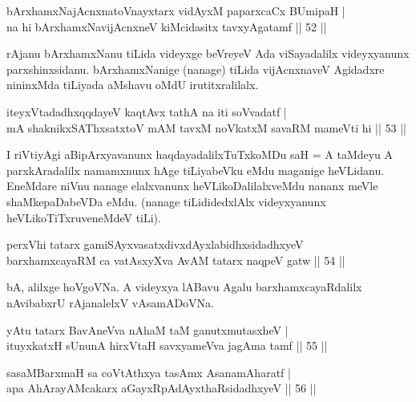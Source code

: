 \begin{shl}
bArxhamxNajAcnxnatoV\s nayxtarx vidAyxM paparxcaCx BUmipaH | \\
na hi bArxhamxNavijAcnxneV kiMcidasitx tavxyA\s gatamf \hfill|| 52 || 
\end{shl}

\begin{artha}
rAjanu bArxhamxNanu tiLida videyxge beVreyeV Ada viSayadalilx 
videyxyanunx parxshinxsidanu. bArxhamxNanige (nanage) tiLida vijAcnxnaveV 
Agidadxre nininxMda tiLiyada aMshavu oMdU irutitxralilalx.
\end{artha}

\begin{shl}
iteyxVtadadhxqqdayeV kaqtAvx tathA na iti soV\s vadatf | \\
mA shaknikxSAThxsatxtoV mAM tavxM noVkatxM savaRM mameVti hi \hfill|| 53 || 
\end{shl} 

\begin{artha}
I riVtiyAgi aBipArxyavanunx haqdayadalilxTuTxkoMDu saH = A taMdeyu A 
parxkAradalilx namamxnunx hAge tiLiyabeVku eMdu maganige heVLidanu. 
EneMdare niVnu nanage elalxvanunx heVLikoDalilalxveMdu nananx meVle 
shaMkepaDabeVDa eMdu. (nanage tiLididedxlAlx videyxyanunx 
heVLikoTiTxruveneMdeV tiLi).
\end{artha}

\begin{shl}
perxVhi tatarx gamiSAyxvasatxdivxdAyxlabidhxsidadhxyeV\\
barxhamxcayaRM ca vatAsxyXva AvAM tatarx naqpeV gatw \hfill|| 54 || 
\end{shl}

\begin{artha}
bA, alilxge hoVgoVNa. A videyxya lABavu Agalu barxhamxcayaRdalilx 
nAvibabxrU rAjanalelxV vAsamADoVNa.
\end{artha}


\begin{shl}
yAtu tatarx BavAneVva nAhaM taM ganutxmutasxheV | \\
ituyxkatxH sUnunA hirxVtaH savxyameVva jagAma tamf \hfill|| 55 || 
\end{shl}

\begin{shl}
sasaMBarxmaH sa coVtAthxya tasAmx AsanamAharatf | \\
apa AhArayAMcakarx aGayxRpAdAyxthaRsidadhxyeV \hfill|| 56 || 
\end{shl}

